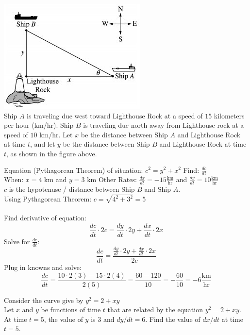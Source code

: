 \documentclass[12pt,letterpaper, onecolumn]{exam}
\begin{document}
\begin{questions}
		\question \includegraphics[width=0.7\linewidth]{Question04-001} \\ 
		Ship $A$ is traveling due west toward Lighthouse Rock at a speed of $15$ kilometers per hour (km/hr). Ship $B$ is traveling due north away from Lighthouse rock at a speed of $10$ km/hr. Let $x$ be the distance between Ship $A$ and Lighthouse Rock at time $t$, and let $y$ be the distance between Ship $B$ and Lighthouse Rock at time $t$, as shown in the figure above.
			\begin{solution}
				\vfill
				Equation (Pythagorean Theorem) of situation: $c^2=y^2+x^2$
				Find: $\frac{dc}{dt}$ \\
				When: $x=4$ km and $y=3$ km
				Other Rates: $\frac{dx}{dt} = -15 \frac{\text{km}}{\text{hr}}$ and $\frac{dy}{dt} = 10 \frac{\text{km}}{\text{hr}}$ \\
				$c$ is the hypotenuse / distance between Ship $B$ and Ship $A$. \\
				Using Pythagorean Theorem: $ c = \sqrt{4^2 + 3^2} = 5 $ \\ \\ 
				Find derivative of equation:
				$$\frac{dc}{dt} \cdot 2c = \frac{dy}{dt} \cdot 2y + \frac{dx}{dt} \cdot 2x$$
				Solve for $\frac{dc}{dt}$:
				$$\frac{dc}{dt}  = \frac{\frac{dy}{dt} \cdot 2y + \frac{dx}{dt} \cdot 2x}{2c}$$
				Plug in knowns and solve:
				$$\frac{dc}{dt}  = \frac{10 \cdot 2(3) - 15 \cdot 2(4)}{2(5)} = \frac{60-120}{10} = - \frac{60}{10} = \boxed{-6 \frac{\text{km}}{\text{hr}}}$$
			\end{solution}
		\question Consider the curve give by $y^2=2+xy$ \\
		Let $x$ and $y$ be functions of time $t$ that are related by the equation $y^2 = 2 + xy$. At time $t=5$, the value of $y$ is $3$ and $dy/dt = 6$. Find the value of $dx/dt$ at time $t=5$.
		\begin{solution}

\end{solution}
\end{questions}
\end{document}
